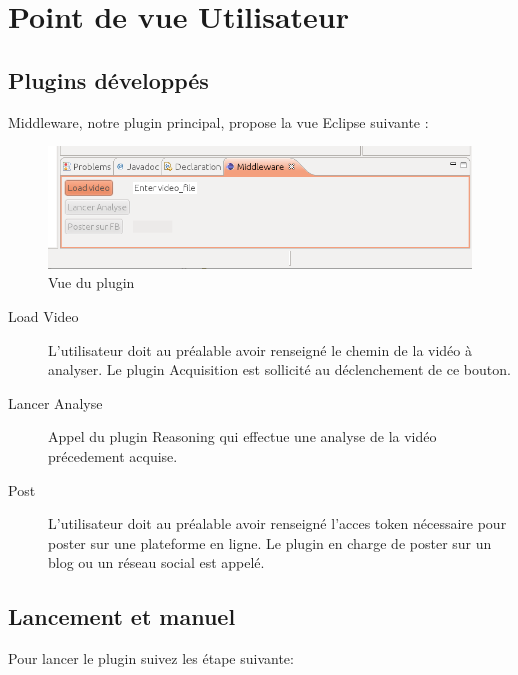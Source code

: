 \chapter{Point de vue Utilisateur}

\section{Plugins développés}
Middleware, notre plugin principal, propose la vue Eclipse suivante : 
  \begin{figure}[h]
	  \centering
	  \includegraphics[scale=0.50]{img/Capture}
	  \caption{Vue du plugin}
	  \label{fig:vue}
\end{figure} 
\begin{description}
\item[Load Video]
L'utilisateur doit au préalable avoir renseigné le chemin de la vidéo à analyser. Le plugin Acquisition est sollicité au déclenchement de ce bouton. 
\item[Lancer Analyse]
Appel du plugin Reasoning qui effectue une analyse de la vidéo précedement acquise.
\item[Post]
L'utilisateur doit au préalable avoir renseigné l'acces token nécessaire pour poster sur une plateforme en ligne. 
Le plugin en charge de poster sur un blog ou un réseau social est appelé.
\end{description}
 
 \clearpage
 
\section{Lancement et manuel}
Pour lancer le plugin suivez les étape suivante:


